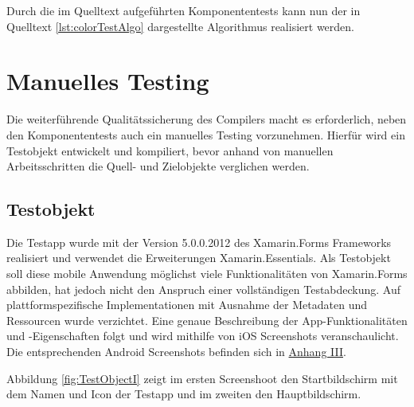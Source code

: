 Durch die im Quelltext aufgeführten Komponententests kann nun der in Quelltext \ref{lst:colorTestAlgo} dargestellte Algorithmus realisiert werden. 
\newpage



\section{Manuelles Testing}
Die weiterführende Qualitätssicherung des Compilers macht es erforderlich,  neben den Komponententests auch ein manuelles Testing vorzunehmen. Hierfür wird ein Testobjekt entwickelt und kompiliert, bevor anhand von manuellen Arbeitsschritten die Quell- und Zielobjekte verglichen werden.

\subsection{Testobjekt}
Die Testapp wurde mit der Version 5.0.0.2012 des Xamarin.Forms Frameworks realisiert und verwendet die Erweiterungen Xamarin.Essentials.  Als Testobjekt soll diese mobile Anwendung möglichst viele Funktionalitäten von Xamarin.Forms abbilden,  hat jedoch nicht den Anspruch einer vollständigen Testabdeckung.
Auf plattformspezifische Implementationen mit Ausnahme der Metadaten und Ressourcen wurde verzichtet.  Eine genaue Beschreibung der App-Funktionalitäten und -Eigenschaften folgt und wird mithilfe von iOS Screenshots veranschaulicht.  Die entsprechenden Android Screenshots befinden sich in \hyperref[chap:AnhangAndroidScreenshots]{Anhang III}.  

Abbildung \ref{fig:TestObjectI} zeigt im ersten Screenshoot den Startbildschirm mit dem Namen und Icon der Testapp und im zweiten den Hauptbildschirm.  


